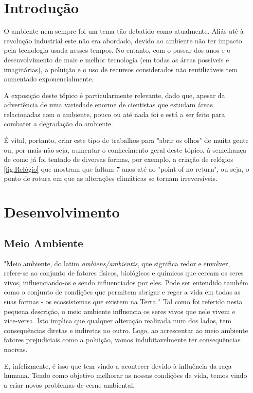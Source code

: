\documentclass[letterpaper,12pt]{article}
\begin{document}
\section{Introdução}
\large O ambiente nem sempre foi um tema tão debatido como atualmente. Aliás até à revolução industrial este não era abordado, devido ao ambiente não ter impacto pela tecnologia usada nesses tempos. No entanto, com o passar dos anos e o desenvolvimento de mais e melhor tecnologia (em todas as áreas possíveis e imaginárias), a poluição e o uso de recursos considerados não reutilizáveis tem aumentado exponencialmente.
\par A exposição deste tópico é particularmente relevante, dado que, apesar da advertência de uma variedade enorme de cientistas que estudam áreas relacionadas com o ambiente, pouco ou até nada foi e está a ser feito para combater a degradação do ambiente.
\par É vital, portanto, criar este tipo de trabalhos para "abrir os olhos" de muita gente ou, por mais não seja, aumentar o conhecimento geral deste tópico, à semelhança de como já foi tentado de diversas formas, por exemplo, a criação de relógios \ref{fig:Relógio} que mostram que faltam 7 anos até ao "point of no return", ou seja, o ponto de rotura em que as alterações climáticas se tornam irreversíveis.
\section{Desenvolvimento}
\subsection{Meio Ambiente}
\citep{a2020_meio}
\large "Meio ambiente, do latim \textit{ambiens/ambientis}, que significa redor e envolver, refere-se ao conjunto de fatores físicos, biológicos e químicos que cercam os seres vivos, influenciando-os e sendo influenciados por eles. Pode ser entendido também como o conjunto de condições que permitem abrigar e reger a vida em todas as suas formas - os ecossistemas que existem na Terra."
Tal como foi referido nesta pequena descrição, o meio ambiente influencia os seres vivos que nele vivem e vice-versa. Isto implica que qualquer alteração realizada num dos lados, tem consequências diretas e indiretas no outro. Logo, ao acrescentar ao meio ambiente fatores prejudiciais como a poluição, vamos indubitavelmente ter consequências nocivas.
\par E, infelizmente, é isso que tem vindo a acontecer devido à influência da raça humana. Tendo como objetivo melhorar as nossas condições de vida, temos vindo a criar novos problemas de cerne ambiental.
\end{document}
